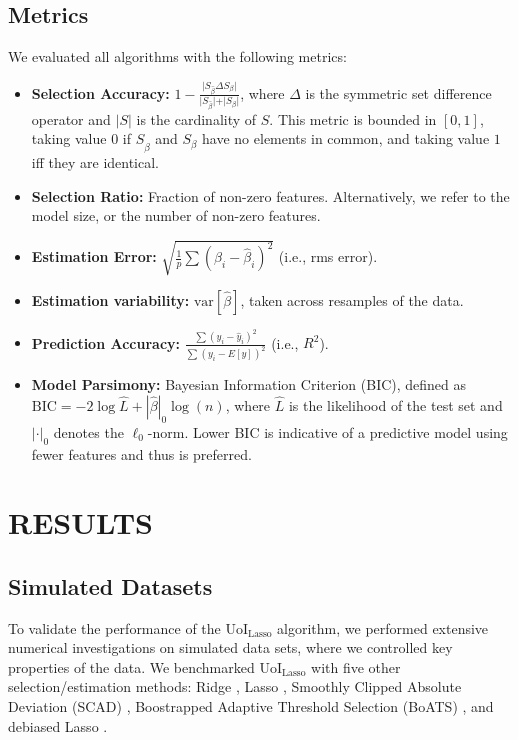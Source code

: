 \documentclass[letterpaper, 10 pt, conference]{ieeeconf}  %
\begin{document}
\subsection{Metrics}
We evaluated all algorithms with the following metrics:
\begin{itemize}
    \item \textbf{Selection Accuracy:} $1-\frac{\vert S_{\hat{\beta}} \Delta S_{\beta}\vert}{|S_{\hat{\beta}}\vert + \vert S_{\beta} \vert}$, where $\Delta$ is the symmetric set difference operator and $|S|$ is the cardinality of $S$. This metric is bounded in $[0, 1]$, taking value $0$ if $S_{\hat{\beta}}$ and $S_{\beta}$ have no elements in common, and taking value $1$ iff they are identical.
    \item \textbf{Selection Ratio:} Fraction of non-zero features. Alternatively, we refer to the model size, or the number of non-zero features.
    \item \textbf{Estimation Error:} $\sqrt{\frac{1}{p} \sum (\beta_i - \hat{\beta}_i)^2}$ (i.e., rms error).
    \item \textbf{Estimation variability:} $\text{var}[\hat{\beta}]$, taken across resamples of the data.
    \item \textbf{Prediction Accuracy:} $\frac{\sum \left(y_i - \hat{y}_i\right)^2}{\sum \left(y_i - E[y]\right)^2}$ (i.e., $R^2$).
    \item \textbf{Model Parsimony:} Bayesian Information Criterion (BIC), defined as $\text{BIC} = -2\log \hat{L} + |\hat{\beta}|_0 \log(n)$, where $\hat{L}$ is the likelihood of the test set and $|\cdot|_0$ denotes the $\ell_0$-norm. Lower BIC is indicative of a predictive model using fewer features and thus is preferred.
\end{itemize}
\section{RESULTS}
\subsection{Simulated Datasets}
To validate the performance of the UoI$_{\text{Lasso}}$ algorithm, we performed extensive numerical investigations on simulated data sets, where we controlled key properties of the data. We benchmarked UoI$_{\text{Lasso}}$ with five other selection/estimation methods: Ridge \cite{elements}, Lasso \cite{lasso}, Smoothly Clipped Absolute Deviation (SCAD) \cite{scad}, Boostrapped Adaptive Threshold Selection (BoATS) \cite{boats}, and debiased Lasso \cite{dbLasso}. 
\end{document}
